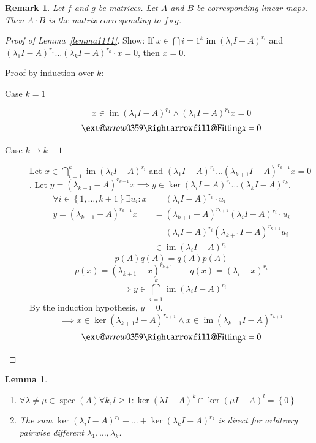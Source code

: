 \documentclass{article}
\makeatletter
\newcounter{lecref}[section]
\numberwithin{lecref}{section}
\newtheorem{lemma}[lecref]{Lemma}
\newtheorem{remark}[lecref]{Remark}
\newcommand{\set}[1]{\left\{#1\right\}}
\newcommand{\xRightarrow}[2][]{\ext@arrow 0359\Rightarrowfill@{#1}{#2}}
\DeclareMathOperator{\im}{im}
\makeatother
\begin{document}
\begin{remark}
  Let $f$ and $g$ be matrices. Let $A$ and $B$ be corresponding linear maps.
  Then $A \cdot B$ is the matrix corresponding to $f \circ g$.
\end{remark}

\begin{proof}[Proof of Lemma~\ref{lemma1111}]
  Show: If $x \in \bigcap{i=1}^k \im(\lambda_i I - A)^{r_i}$ and $(\lambda_1 I - A)^{r_1} \dots (\lambda_k I - A)^{r_k} \cdot x = 0$, then $x = 0$.

  Proof by induction over $k$:
  \begin{description}
    \item[Case $k=1$]
      \[ x \in \im(\lambda_1 I - A)^{r_1} \land (\lambda_1 I - A)^{r_1} x = 0 \]
      \[ \xRightarrow{\text{Fitting}} x = 0 \]
    \item[Case $k \to k+1$]
      Let $x \in \bigcap_{i=1}^k \im(\lambda_i I - A)^{r_i}$ and $(\lambda_1 I - A)^{r_1} \dots (\lambda_{k+1} I - A)^{r_{k+1}} x = 0$.
      Let $y = (\lambda_{k+1} - A)^{r_{k+1}} x \implies y \in \ker(\lambda_i I - A)^{r_i} \dots (\lambda_k I - A)^{r_k}$.
      \begin{align*}
        \forall i \in \set{1, \dots, k+1} \exists u_i: x &= (\lambda_i I - A)^{r_i} \cdot u_i \\
        y = (\lambda_{k+1} - A)^{r_{k+1}} x &= (\lambda_{k+1} - A)^{r_{k+1}} (\lambda_i I - A)^{r_i} \cdot u_i \\
          &= (\lambda_i I - A)^{r_i} (\lambda_{k+1} I - A)^{r_{k+1}} u_i \\
          &\in \im(\lambda_i I - A)^{r_i}
      \end{align*}
      \[ p(A) q(A) = q(A) p(A) \]
      \[ p(x) = (\lambda_{k+1} - x)^{r_{k+1}} \qquad q(x) = (\lambda_i - x)^{r_i} \]
      \[ \implies y \in \bigcap_{i=1}^{k} \im(\lambda_i I - A)^{r_i} \]
      By the induction hypothesis, $y = 0$.
      \[ \implies x \in \ker(\lambda_{k+1} I - A)^{r_{k+1}} \land x \in \im(\lambda_{k+1} I - A)^{r_{k+1}} \]
      \[ \xRightarrow{\text{Fitting}} x = 0 \]
  \end{description}
\end{proof}

\begin{lemma} %
  \label{le1113}%
  \begin{enumerate} \hfill{}
    \item $\forall \lambda \neq \mu \in \operatorname{spec}(A) \forall k,l \geq 1: \ker(\lambda I - A)^k \cap \ker(\mu I - A)^l = \set{0}$
    \item The sum $\ker(\lambda_i I - A)^{r_1} + \dots + \ker(\lambda_k I - A)^{r_k}$ is direct for arbitrary pairwise different $\lambda_1, \dots, \lambda_k$.
  \end{enumerate}
\end{lemma}
\end{document}
